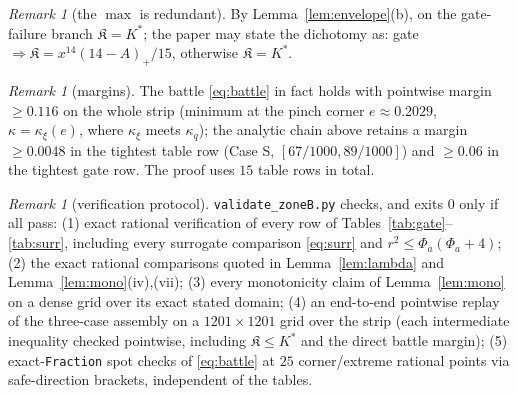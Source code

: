 \documentclass[11pt]{article}
\theoremstyle{remark}
\newtheorem{remark}[lemma]{Remark}
\newcommand{\Kfrak}{\mathfrak K}
\newcommand{\Kstar}{K^{*}}
\newcommand{\kxi}{\kappa_\xi}
\begin{document}
\begin{remark}[the $\max$ is redundant]
By Lemma~\ref{lem:envelope}(b), on the gate-failure branch
$\Kfrak=\Kstar$; the paper may state the dichotomy as: gate
$\Rightarrow\Kfrak=x^{14}(14-A)_+/15$, otherwise $\Kfrak=\Kstar$.
\end{remark}

\begin{remark}[margins]
The battle \eqref{eq:battle} in fact holds with pointwise margin
$\ge0.116$ on the whole strip (minimum at the pinch corner
$e\approx0.2029$, $\kappa=\kxi(e)$, where $\kxi$ meets $\kappa_q$); the
analytic chain above retains a margin $\ge0.0048$ in the tightest table
row (Case S, $[67/1000,89/1000]$) and $\ge0.06$ in the tightest gate row.
The proof uses $15$ table rows in total.
\end{remark}

\begin{remark}[verification protocol]
\texttt{validate\_zoneB.py} checks, and exits $0$ only if all pass:
(1) exact rational verification of every row of
Tables~\ref{tab:gate}--\ref{tab:surr}, including every surrogate comparison
\eqref{eq:surr} and $r^2\le\Phi_a(\Phi_a+4)$;
(2) the exact rational comparisons quoted in Lemma~\ref{lem:lambda} and
Lemma~\ref{lem:mono}(iv),(vii);
(3) every monotonicity claim of Lemma~\ref{lem:mono} on a dense grid over
its exact stated domain;
(4) an end-to-end pointwise replay of the three-case assembly on a
$1201\times1201$ grid over the strip (each intermediate inequality
checked pointwise, including $\Kfrak\le\Kstar$ and the direct battle
margin);
(5) exact-\texttt{Fraction} spot checks of \eqref{eq:battle} at $25$
corner/extreme rational points via safe-direction brackets, independent of
the tables.
\end{remark}
\end{document}

